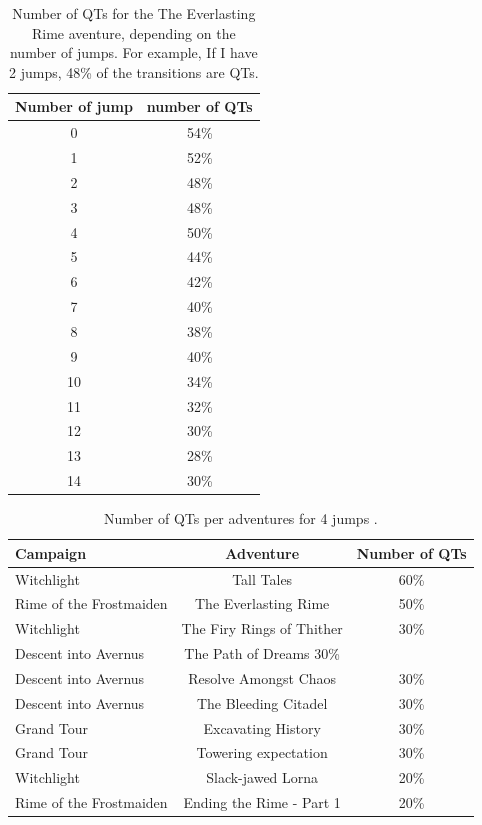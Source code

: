 \documentclass{article}
\begin{document}
\begin{table}[ht!]
\centering
\caption{Number of QTs for the The Everlasting Rime aventure, depending on the number of jumps.
For example, If I have 2 jumps, 48\% of the transitions are QTs.
}
\label{tbl:tallTaleQts}
\begin{small}
\begin{tabular}{ c | c }
\toprule
Number of jump & number of QTs \\
\midrule
0 & 54\% \\
1 & 52\% \\
2 & 48\% \\
3 & 48\% \\
4 & 50\% \\
5 & 44\% \\
6 & 42\% \\
7 & 40\% \\
8 & 38\% \\
9 & 40\% \\
10 & 34\% \\
11 & 32\% \\
12 & 30\% \\
13 & 28\% \\
14 & 30\% \\
\bottomrule
\end{tabular}
\end{small}
\end{table}

\begin{table}[ht!]
\centering
\caption{Number of QTs per adventures for 4 jumps \briv.
}
\label{tbl:fourJumpsQts}
\begin{small}
\begin{tabular}{ l c c }
\toprule
Campaign & Adventure & Number of QTs \\
\midrule
Witchlight & Tall Tales & 60\% \\
Rime of the Frostmaiden & The Everlasting Rime & 50\% \\
Witchlight & The Firy Rings of Thither & 30\% \\
Descent into Avernus & The Path of Dreams 30\% \\
Descent into Avernus & Resolve Amongst Chaos & 30\% \\
Descent into Avernus & The Bleeding Citadel & 30\% \\
Grand Tour & Excavating History & 30\% \\
Grand Tour & Towering expectation & 30\% \\
Witchlight & Slack-jawed Lorna & 20\% \\
Rime of the Frostmaiden & Ending the Rime - Part 1 & 20\% \\
\bottomrule
\end{tabular}
\end{small}
\end{table}
\end{document}
